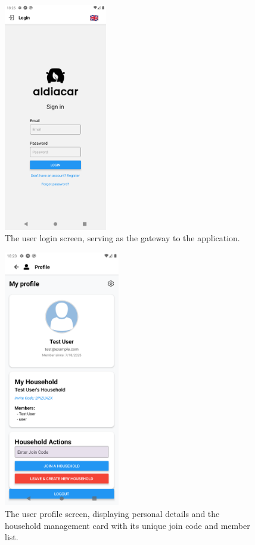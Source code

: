 \begin{figure}[H]
    \centering
    \includegraphics[width=0.4\textwidth]{images/results/login_screen.png}
    \caption{The user login screen, serving as the gateway to the application.}
    \label{fig:login-screen}
\end{figure}

\begin{figure}[H]
    \centering
    \includegraphics[width=0.45\textwidth]{images/results/profile_household_screen.png}
    \caption{The user profile screen, displaying personal details and the household management card with its unique join code and member list.}
    \label{fig:profile-household-screen}
\end{figure}

